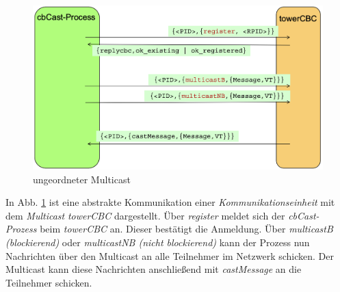 \begin{figure}[htbp]
\begin{center}
\includegraphics[scale=0.4]{Latex/Bilder/towerCBC_1.png}
\caption{\label{fig:towerCBC} ungeordneter Multicast \cite{Aufgabenstellung}} 
\end{center}
\end{figure}

In Abb. \ref{fig:towerCBC} ist eine abstrakte Kommunikation einer \textit{Kommunikationseinheit} mit dem \textit{Multicast} \textit{towerCBC} dargestellt. Über \textit{register} meldet sich der \textit{cbCast-Prozess} beim \textit{towerCBC} an. Dieser bestätigt die Anmeldung. Über \textit{multicastB (blockierend)} oder \textit{multicastNB (nicht blockierend)} kann der Prozess nun Nachrichten über den Multicast an alle Teilnehmer im Netzwerk schicken. Der Multicast kann diese Nachrichten anschließend mit \textit{castMessage} an die Teilnehmer schicken.

